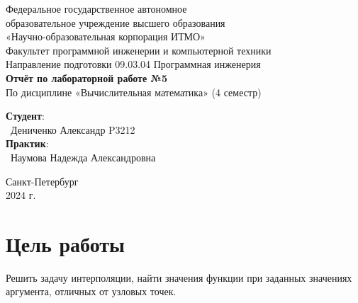 \documentclass{article}
\begin{document}
\begin{center}
    \Large
    Федеральное государственное автономное \\
    образовательное учреждение высшего образования \\ 
    «Научно-образовательная корпорация ИТМО»\\
    \vspace{0.5cm}
    \large
    Факультет программной инженерии и компьютерной техники \\
    Направление подготовки 09.03.04 Программная инженерия \\
    \vspace{1cm}
    \Large
    \textbf{Отчёт по лабораторной работе №5} \\
    По дисциплине «Вычислительная математика» (4 семестр)\\
    \large
    \vspace{8cm}

    \begin{minipage}{.33\textwidth}
    \end{minipage}
    \hfill
    \begin{minipage}{.4\textwidth}
    
        \textbf{Студент}: \vspace{.1cm} \\
        \ Дениченко Александр P3212\\
        \textbf{Практик}:  \\
        \ Наумова Надежда Александровна
    \end{minipage}
    \vfill
Санкт-Петербург\\ 2024 г.
\end{center}
\pagestyle{empty}
\newpage
\pagestyle{plain}
\section{Цель работы}
Решить задачу интерполяции, найти значения функции при заданных значениях аргумента, отличных от узловых точек.
\end{document}
